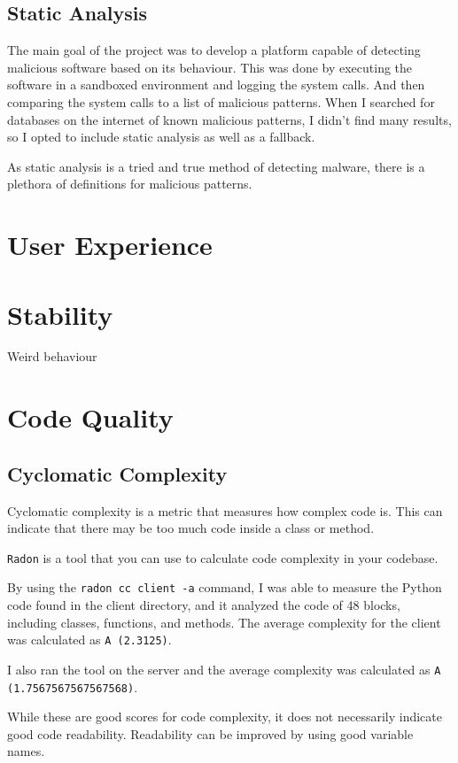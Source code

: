 \subsection{Static Analysis}
The main goal of the project was to develop a platform capable
of detecting malicious software based on its behaviour.
This was done by executing the software in a sandboxed
environment and logging the system calls.
And then comparing the system calls to a list of malicious patterns.
When I searched for databases on the internet of known malicious patterns,
I didn't find many results, so I opted to include static analysis as well as a fallback.

As static analysis is a tried and true method of detecting malware,
there is a plethora of definitions for malicious patterns.

\section{User Experience}

\section{Stability}
Weird behaviour

\section{Code Quality}

\subsection{Cyclomatic Complexity}
Cyclomatic complexity is a metric that measures how complex code is.
This can indicate that there may be too much code inside a class or method.

\texttt{Radon} is a tool that you can use to
calculate code complexity in your codebase.

By using the \texttt{radon cc client -a} command,
I was able to measure the Python code found in the client directory,
and it analyzed the code of 48 blocks,
including classes, functions, and methods.
The average complexity for the client was calculated as \texttt{A (2.3125)}.

I also ran the tool on the server and the average complexity
was calculated as \texttt{A (1.7567567567567568)}.

While these are good scores for code complexity,
it does not necessarily indicate good code readability.
Readability can be improved by using good variable names.

